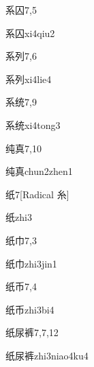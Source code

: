 \begin{entry}{系囚}{7,5}
  \begin{phonetics}{系囚}{xi4qiu2}
  \end{phonetics}
\end{entry}

\begin{entry}{系列}{7,6}
  \begin{phonetics}{系列}{xi4lie4}
  \end{phonetics}
\end{entry}

\begin{entry}{系统}{7,9}
  \begin{phonetics}{系统}{xi4tong3}
  \end{phonetics}
\end{entry}

\begin{entry}{纯真}{7,10}
  \begin{phonetics}{纯真}{chun2zhen1}
  \end{phonetics}
\end{entry}

\begin{entry}{纸}{7}[Radical 糸]
  \begin{phonetics}{纸}{zhi3}
  \end{phonetics}
\end{entry}

\begin{entry}{纸巾}{7,3}
  \begin{phonetics}{纸巾}{zhi3jin1}
  \end{phonetics}
\end{entry}

\begin{entry}{纸币}{7,4}
  \begin{phonetics}{纸币}{zhi3bi4}
  \end{phonetics}
\end{entry}

\begin{entry}{纸尿裤}{7,7,12}
  \begin{phonetics}{纸尿裤}{zhi3niao4ku4}
  \end{phonetics}
\end{entry}

